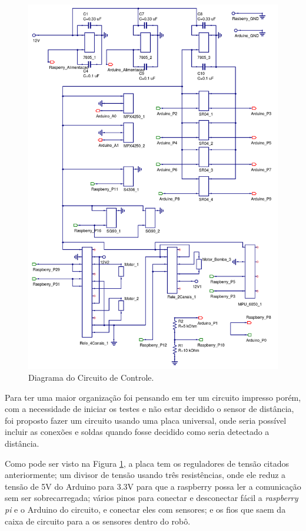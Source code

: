 \begin{figure}[h]
  \centering
  \includegraphics[width=\textwidth]{figuras/circuit.png}
  \caption{Diagrama do Circuito de Controle.}
  \label{fig:circuit}
\end{figure}
\FloatBarrier

Para ter uma maior organização foi pensando em ter um circuito impresso porém, com a necessidade de iniciar os testes e não estar decidido o sensor de distância, foi proposto fazer um circuito usando uma placa universal, onde seria possível incluir as conexões e soldas quando fosse decidido como seria detectado a distância.

Como pode ser visto na Figura \ref{fig:circuit}, a placa tem os reguladores de tensão citados anteriormente; um divisor de tensão usando três resistências, onde ele reduz a tensão de 5V do Arduino para 3.3V para que a raspberry possa ler a comunicação sem ser sobrecarregada; vários pinos para conectar e desconectar fácil a \textit{raspberry pi} e o Arduino do circuito, e conectar eles com sensores; e os fios que saem da caixa de circuito para a os sensores dentro do robô.

